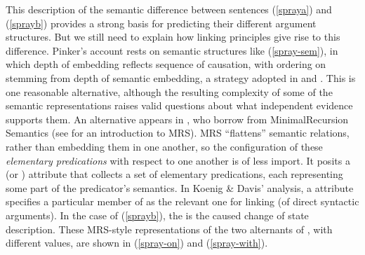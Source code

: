 \documentclass[output=paper,biblatex,babelshorthands,newtxmath,draftmode,colorlinks, citecolor=brown]{langscibook}
\begin{document}
This description of the semantic difference between sentences (\ref{spraya}) and (\ref{sprayb}) provides a strong basis for predicting their different argument structures.
But we still need to explain how linking principles give rise to this difference.
Pinker's account rests on semantic structures like (\ref{spray-sem}), in which depth of embedding reflects sequence of causation, with ordering on \argst stemming from depth of semantic embedding, a strategy adopted in \citet{Davis1996} and \citet{Davis2001}.
This is one reasonable alternative, although the resulting complexity of some of the semantic representations raises valid questions about what independent evidence supports them.
An alternative appears in \citet{KoenigandDavis2006}, who borrow from Minimal\indexmrs Recursion Semantics (see  for an introduction to MRS).
MRS ``flattens'' semantic relations, rather than embedding them in one another, so the configuration of these \emph{elementary predications} with respect to one another is of less import.
It posits a  (or \rels) attribute that collects a set of elementary predications, each representing some part of the predicator's semantics.
In Koenig \& Davis' analysis, a  attribute specifies a particular member of \rels as the relevant one for linking (of direct syntactic arguments).
In the case of (\ref{sprayb}), the  is the caused change of state description.
These MRS-style representations of the two alternants of , with different  values, are shown in (\ref{spray-on}) and (\ref{spray-with}).

\begin{exe}
\ex\label{spray-on}
\end{exe}

\begin{exe}\ex\label{spray-with}
\end{exe}                  
\end{document}

